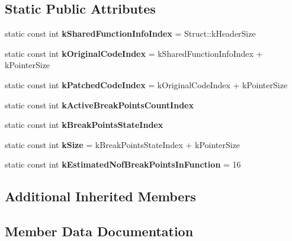 \subsection*{Static Public Attributes}
\begin{DoxyCompactItemize}
\item 
\hypertarget{classv8_1_1internal_1_1_debug_info_ac18e2f70bcdf450c4755ec31e64e1c2a}{}static const int {\bfseries k\+Shared\+Function\+Info\+Index} = Struct\+::k\+Header\+Size\label{classv8_1_1internal_1_1_debug_info_ac18e2f70bcdf450c4755ec31e64e1c2a}

\item 
\hypertarget{classv8_1_1internal_1_1_debug_info_a4d78c0f277bb0e884913bc0a82d411d7}{}static const int {\bfseries k\+Original\+Code\+Index} = k\+Shared\+Function\+Info\+Index + k\+Pointer\+Size\label{classv8_1_1internal_1_1_debug_info_a4d78c0f277bb0e884913bc0a82d411d7}

\item 
\hypertarget{classv8_1_1internal_1_1_debug_info_ad4c7b048ca57e2b503cf7b84932b8e2d}{}static const int {\bfseries k\+Patched\+Code\+Index} = k\+Original\+Code\+Index + k\+Pointer\+Size\label{classv8_1_1internal_1_1_debug_info_ad4c7b048ca57e2b503cf7b84932b8e2d}

\item 
static const int {\bfseries k\+Active\+Break\+Points\+Count\+Index}
\item 
static const int {\bfseries k\+Break\+Points\+State\+Index}
\item 
\hypertarget{classv8_1_1internal_1_1_debug_info_a1c7cf51674bd009e80b4e9fbd7e53cd3}{}static const int {\bfseries k\+Size} = k\+Break\+Points\+State\+Index + k\+Pointer\+Size\label{classv8_1_1internal_1_1_debug_info_a1c7cf51674bd009e80b4e9fbd7e53cd3}

\item 
\hypertarget{classv8_1_1internal_1_1_debug_info_a0b1600830cc1002be957fe793f3cf28c}{}static const int {\bfseries k\+Estimated\+Nof\+Break\+Points\+In\+Function} = 16\label{classv8_1_1internal_1_1_debug_info_a0b1600830cc1002be957fe793f3cf28c}

\end{DoxyCompactItemize}
\subsection*{Additional Inherited Members}


\subsection{Member Data Documentation}
\hypertarget{classv8_1_1internal_1_1_debug_info_a8485069bf33e7b36f9979f6e16bb9758}{}
